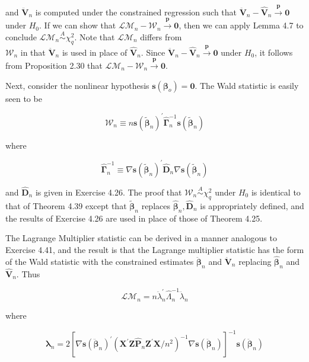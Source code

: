 \documentclass[10pt]{article}
\begin{document}
and $\ddot{\mathbf{V}}_{n}$ is computed under the constrained regression such that $\ddot{\mathbf{V}}_{n}- \hat{\mathbf{V}}_{n} \xrightarrow{\boldsymbol{p}} \mathbf{0}$ under $H_{0}$. If we can show that $\mathcal{L} \mathcal{M}_{n}-\mathcal{W}_{n} \xrightarrow{\boldsymbol{p}} \mathbf{0}$, then we can apply Lemma 4.7 to conclude $\mathcal{L} \mathcal{M}_{n} \stackrel{A}{\sim} \chi_{q}^{2}$. Note that $\mathcal{L} \mathcal{M}_{n}$ differs from\\
$\mathcal{W}_{n}$ in that $\ddot{\mathbf{V}}_{n}$ is used in place of $\hat{\mathbf{V}}_{n}$. Since $\ddot{\mathbf{V}}_{n}-\hat{\mathbf{V}}_{n} \xrightarrow{\boldsymbol{p}} \mathbf{0}$ under $H_{0}$, it follows from Proposition 2.30 that $\mathcal{L} \mathcal{M}_{n}-\mathcal{W}_{n} \xrightarrow{\boldsymbol{p}} \mathbf{0}$.

Next, consider the nonlinear hypothesis $\mathbf{s}\left(\boldsymbol{\beta}_{o}\right)=\mathbf{0}$. The Wald statistic is easily seen to be

$$
\mathcal{W}_{n} \equiv n \mathbf{s}\left(\tilde{\boldsymbol{\beta}}_{n}\right)^{\prime} \hat{\boldsymbol{\Gamma}}_{n}^{-1} \mathbf{s}\left(\tilde{\boldsymbol{\beta}}_{n}\right)
$$

where

$$
\hat{\boldsymbol{\Gamma}}_{n}^{-1} \equiv \nabla \mathbf{s}\left(\tilde{\boldsymbol{\beta}}_{n}\right)^{\prime} \hat{\mathbf{D}}_{n} \nabla \mathbf{s}\left(\tilde{\boldsymbol{\beta}}_{n}\right)
$$

and $\hat{\mathbf{D}}_{n}$ is given in Exercise 4.26. The proof that $\mathcal{W}_{n} \stackrel{A}{\sim} \chi_{q}^{2}$ under $H_{0}$ is identical to that of Theorem 4.39 except that $\tilde{\boldsymbol{\beta}}_{n}$ replaces $\hat{\boldsymbol{\beta}}_{n}, \hat{\mathbf{D}}_{n}$ is appropriately defined, and the results of Exercise 4.26 are used in place of those of Theorem 4.25.

The Lagrange Multiplier statistic can be derived in a manner analogous to Exercise 4.41, and the result is that the Lagrange multiplier statistic has the form of the Wald statistic with the constrained estimates $\ddot{\boldsymbol{\beta}}_{n}$ and $\ddot{\boldsymbol{V}}_{n}$ replacing $\hat{\boldsymbol{\beta}}_{n}$ and $\hat{\mathbf{V}}_{n}$. Thus

$$
\mathcal{L} \mathcal{M}_{n}=n \ddot{\lambda}_{n}^{\prime} \hat{\Lambda}_{n}^{-1} \ddot{\lambda}_{n}
$$

where

$$
\boldsymbol{\lambda}_{n}=2\left[\nabla \mathbf{s}\left(\ddot{\boldsymbol{\beta}}_{n}\right)^{\prime}\left(\mathbf{X}^{\prime} \mathbf{Z} \hat{\mathbf{P}}_{n} \mathbf{Z}^{\prime} \mathbf{X} / n^{2}\right)^{-1} \nabla \mathbf{s}\left(\ddot{\boldsymbol{\beta}}_{n}\right)\right]^{-1} \mathbf{s}\left(\ddot{\boldsymbol{\beta}}_{n}\right)
$$
\end{document}

